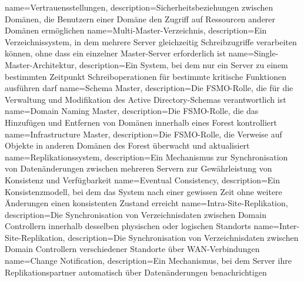 {
	name={Ver\-trau\-ens\-stel\-lun\-gen},
	description={Si\-cher\-heits\-be\-zie\-hun\-gen zwi\-schen Do\-mä\-nen, die Be\-nut\-zern ei\-ner Do\-mä\-ne den Zu\-griff auf Res\-sour\-cen an\-de\-rer Do\-mä\-nen er\-mög\-li\-chen}
}
{
	name={Mul\-ti-Mas\-ter-Ver\-zeich\-nis},
	description={Ein Ver\-zeich\-nis\-sys\-tem, in dem meh\-re\-re Ser\-ver gleich\-zei\-tig Schreib\-zu\-grif\-fe ver\-ar\-bei\-ten kön\-nen, ohne dass ein ein\-zel\-ner Mas\-ter-Ser\-ver er\-for\-der\-lich ist}
}
{
	name={Sin\-gle-Mas\-ter-Ar\-chi\-tek\-tur},
	description={Ein Sys\-tem, bei dem nur ein Ser\-ver zu ei\-nem be\-stimm\-ten Zeit\-punkt Schreib\-ope\-ra\-tio\-nen für be\-stimm\-te kri\-ti\-sche Funk\-tio\-nen aus\-füh\-ren darf}
}
{
	name={Sche\-ma Mas\-ter},
	description={Die FSMO-Rol\-le, die für die Ver\-wal\-tung und Mo\-di\-fi\-ka\-ti\-on des Ac\-tive Di\-rec\-to\-ry-Sche\-mas ver\-ant\-wort\-lich ist}
}
{
	name={Do\-main Na\-ming Mas\-ter},
	description={Die FSMO-Rol\-le, die das Hin\-zu\-fü\-gen und Ent\-fer\-nen von Do\-mä\-nen in\-ner\-halb ei\-nes Fo\-rest kon\-trol\-liert}
}
{
	name={In\-fra\-struc\-ture Mas\-ter},
	description={Die FSMO-Rol\-le, die Ver\-wei\-se auf Ob\-jek\-te in an\-de\-ren Do\-mä\-nen des Fo\-rest über\-wacht und ak\-tua\-li\-siert}
}
{
	name={Re\-pli\-ka\-ti\-ons\-sys\-tem},
	description={Ein Me\-cha\-nis\-mus zur Syn\-chro\-ni\-sa\-ti\-on von Da\-ten\-än\-de\-run\-gen zwi\-schen meh\-re\-ren Ser\-vern zur Ge\-währ\-leis\-tung von Kon\-sis\-tenz und Ver\-füg\-bar\-keit}
}
{
	name={Even\-tu\-al Con\-sis\-ten\-cy},
	description={Ein Kon\-sis\-tenz\-mo\-dell, bei dem das Sys\-tem nach ei\-ner ge\-wis\-sen Zeit ohne wei\-te\-re Än\-de\-run\-gen ei\-nen kon\-sis\-ten\-ten Zu\-stand er\-reicht}
}
{
	name={In\-tra-Site-Re\-pli\-ka\-ti\-on},
	description={Die Syn\-chro\-ni\-sa\-ti\-on von Ver\-zeich\-nis\-da\-ten zwi\-schen Do\-main Con\-trol\-lern in\-ner\-halb des\-sel\-ben phy\-si\-schen oder lo\-gi\-schen Stand\-orts}
}
{
	name={In\-ter-Site-Re\-pli\-ka\-ti\-on},
	description={Die Syn\-chro\-ni\-sa\-ti\-on von Ver\-zeich\-nis\-da\-ten zwi\-schen Do\-main Con\-trol\-lern ver\-schie\-de\-ner Stand\-or\-te über WAN-Ver\-bin\-dun\-gen}
}
{
	name={Change No\-ti\-fi\-ca\-ti\-on},
	description={Ein Me\-cha\-nis\-mus, bei dem Ser\-ver ihre Re\-pli\-ka\-ti\-ons\-part\-ner au\-to\-ma\-tisch über Da\-ten\-än\-de\-run\-gen be\-nach\-rich\-ti\-gen}
}
